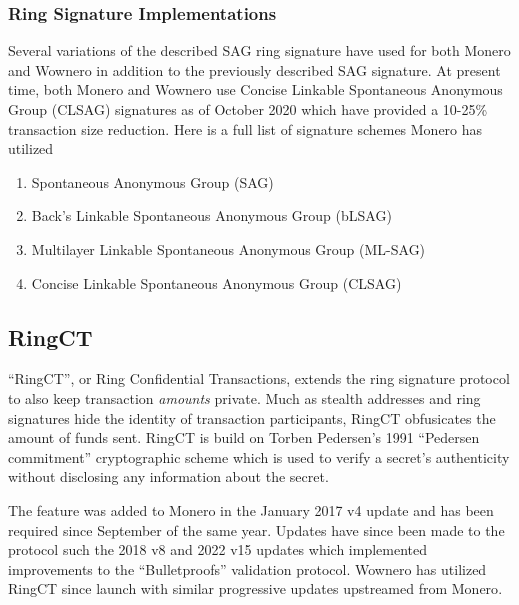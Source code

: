 \subsubsection{Ring Signature Implementations}
Several variations of the described SAG ring signature have used for both Monero and Wownero in addition to the previously described SAG signature\cite{zero2monero}. At present time, both Monero and Wownero use Concise Linkable Spontaneous Anonymous Group (CLSAG) signatures as of October 2020\cite{moneropedia,wowrepo} which have provided a 10-25\% transaction size reduction\cite{moneropedia}. Here is a full list of signature schemes Monero has utilized \cite{zero2monero}
\begin{enumerate}
    \item Spontaneous Anonymous Group (SAG)
    \item Back's Linkable Spontaneous Anonymous Group (bLSAG)
    \item Multilayer Linkable Spontaneous Anonymous Group (ML-SAG)
    \item Concise Linkable Spontaneous Anonymous Group (CLSAG)
\end{enumerate}

\subsection{RingCT}
``RingCT'', or Ring Confidential Transactions\cite{ringct_whitepaper}, extends the ring signature protocol to also keep transaction \emph{amounts} private\cite{moneropedia}. Much as stealth addresses and ring signatures hide the identity of transaction participants, RingCT obfusicates the amount of funds sent\cite{moneropedia}. RingCT is build on Torben Pedersen's 1991 ``Pedersen commitment'' cryptographic scheme which is used to verify a secret's authenticity without disclosing any information about the secret\cite{penderson_commit_whitepaper}.

The feature was added to Monero in the January 2017 v4 update and has been required since September of the same year. Updates have since been made to the protocol such the 2018 v8 and 2022 v15 updates which implemented improvements to the ``Bulletproofs'' validation protocol\cite{monero_repo}. Wownero has utilized RingCT since launch with similar progressive updates upstreamed from Monero\cite{wowrepo}.

